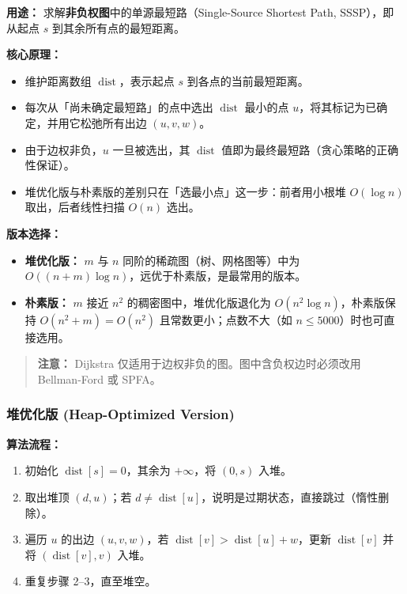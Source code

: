 \textbf{用途：} 求解\textbf{非负权图}中的单源最短路（Single-Source Shortest Path, SSSP），即从起点 $s$ 到其余所有点的最短距离。

\textbf{核心原理：}

\begin{itemize}
  \item 维护距离数组 $\operatorname{dist}$，表示起点 $s$ 到各点的当前最短距离。
  \item 每次从「尚未确定最短路」的点中选出 $\operatorname{dist}$ 最小的点 $u$，将其标记为已确定，并用它松弛所有出边 $(u, v, w)$。
  \item 由于边权非负，$u$ 一旦被选出，其 $\operatorname{dist}$ 值即为最终最短路（贪心策略的正确性保证）。
  \item 堆优化版与朴素版的差别只在「选最小点」这一步：前者用小根堆 $O(\log n)$ 取出，后者线性扫描 $O(n)$ 选出。
\end{itemize}

\textbf{版本选择：}
\begin{itemize}
  \item \textbf{堆优化版：} $m$ 与 $n$ 同阶的稀疏图（树、网格图等）中为 $O((n+m)\log n)$，远优于朴素版，是最常用的版本。
  \item \textbf{朴素版：} $m$ 接近 $n^2$ 的稠密图中，堆优化版退化为 $O(n^2 \log n)$，朴素版保持 $O(n^2 + m) = O(n^2)$ 且常数更小；点数不大（如 $n \le 5000$）时也可直接选用。
\end{itemize}

\begin{quote}
\textbf{注意：} Dijkstra 仅适用于边权非负的图。图中含负权边时必须改用 Bellman-Ford 或 SPFA。
\end{quote}

\subsubsection{堆优化版 (Heap-Optimized Version)}

\textbf{算法流程：}

\begin{enumerate}
  \item 初始化 $\operatorname{dist}[s] = 0$，其余为 $+\infty$，将 $(0, s)$ 入堆。
  \item 取出堆顶 $(d, u)$；若 $d \neq \operatorname{dist}[u]$，说明是过期状态，直接跳过（惰性删除）。
  \item 遍历 $u$ 的出边 $(u, v, w)$，若 $\operatorname{dist}[v] > \operatorname{dist}[u] + w$，更新 $\operatorname{dist}[v]$ 并将 $(\operatorname{dist}[v], v)$ 入堆。
  \item 重复步骤 2--3，直至堆空。
\end{enumerate}

